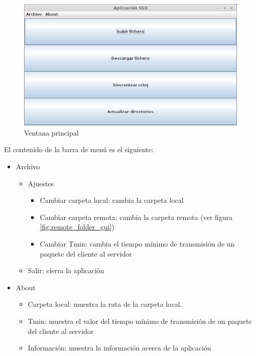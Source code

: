 \begin{figure}[htb]
	\centering
	\includegraphics[scale=0.7]{imagenes/main_gui.png}
	\caption{Ventana principal}
	\label{fig:main_gui}
\end{figure}

\hspace*{-5mm} El contenido de la barra de menú es el siguiente:
\begin{itemize}
	\item Archivo
	\begin{itemize}
		\item Ajuestes
		\begin{itemize}
			\item Cambiar carpeta local: cambia la carpeta local
			\item Cambiar carpeta remota: cambia la carpeta remota (ver figura \ref{fig:remote_folder_gui})
			\item Cambiar Tmin: cambia el tiempo mínimo de transmisión de un paquete del cliente al servidor
		\end{itemize}
		\item Salir: cierra la aplicación
	\end{itemize}
	\item About
	\begin{itemize}
		\item Carpeta local: muestra la ruta de la carpeta local.
		\item Tmin: muestra el valor del tiempo mínimo de transmisión de un paquete del cliente al servidor
		\item Información: muestra la información acerca de la aplicación
	\end{itemize}
\end{itemize}

